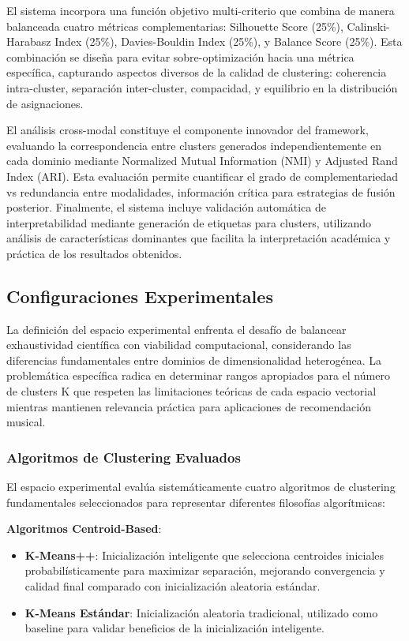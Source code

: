 \documentclass[12pt,a4paper]{report}
\begin{document}
El sistema incorpora una función objetivo multi-criterio que combina de manera balanceada cuatro métricas complementarias: Silhouette Score (25\%), Calinski-Harabasz Index (25\%), Davies-Bouldin Index (25\%), y Balance Score (25\%). Esta combinación se diseña para evitar sobre-optimización hacia una métrica específica, capturando aspectos diversos de la calidad de clustering: coherencia intra-cluster, separación inter-cluster, compacidad, y equilibrio en la distribución de asignaciones.

El análisis cross-modal constituye el componente innovador del framework, evaluando la correspondencia entre clusters generados independientemente en cada dominio mediante Normalized Mutual Information (NMI) y Adjusted Rand Index (ARI). Esta evaluación permite cuantificar el grado de complementariedad vs redundancia entre modalidades, información crítica para estrategias de fusión posterior. Finalmente, el sistema incluye validación automática de interpretabilidad mediante generación de etiquetas para clusters, utilizando análisis de características dominantes que facilita la interpretación académica y práctica de los resultados obtenidos.

\subsection{Configuraciones Experimentales}

La definición del espacio experimental enfrenta el desafío de balancear exhaustividad científica con viabilidad computacional, considerando las diferencias fundamentales entre dominios de dimensionalidad heterogénea. La problemática específica radica en determinar rangos apropiados para el número de clusters K que respeten las limitaciones teóricas de cada espacio vectorial mientras mantienen relevancia práctica para aplicaciones de recomendación musical.

\subsubsection{Algoritmos de Clustering Evaluados}

El espacio experimental evalúa sistemáticamente cuatro algoritmos de clustering fundamentales seleccionados para representar diferentes filosofías algorítmicas:

\textbf{Algoritmos Centroid-Based}:
\begin{itemize}
\item \textbf{K-Means++}: Inicialización inteligente que selecciona centroides iniciales probabilísticamente para maximizar separación, mejorando convergencia y calidad final comparado con inicialización aleatoria estándar.
\item \textbf{K-Means Estándar}: Inicialización aleatoria tradicional, utilizado como baseline para validar beneficios de la inicialización inteligente.
\end{itemize}
\end{document}
